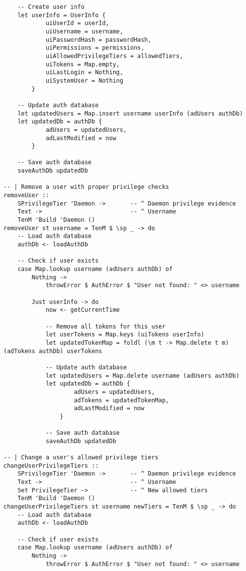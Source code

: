 \documentclass{article}
\begin{document}
\begin{tcolorbox}[title=Ten/Daemon/Auth.hs Changes]
\begin{verbatim}
    -- Create user info
    let userInfo = UserInfo {
            uiUserId = userId,
            uiUsername = username,
            uiPasswordHash = passwordHash,
            uiPermissions = permissions,
            uiAllowedPrivilegeTiers = allowedTiers,
            uiTokens = Map.empty,
            uiLastLogin = Nothing,
            uiSystemUser = Nothing
        }

    -- Update auth database
    let updatedUsers = Map.insert username userInfo (adUsers authDb)
    let updatedDb = authDb {
            adUsers = updatedUsers,
            adLastModified = now
        }

    -- Save auth database
    saveAuthDb updatedDb

-- | Remove a user with proper privilege checks
removeUser ::
    SPrivilegeTier 'Daemon ->       -- ^ Daemon privilege evidence
    Text ->                         -- ^ Username
    TenM 'Build 'Daemon ()
removeUser st username = TenM $ \sp _ -> do
    -- Load auth database
    authDb <- loadAuthDb

    -- Check if user exists
    case Map.lookup username (adUsers authDb) of
        Nothing ->
            throwError $ AuthError $ "User not found: " <> username

        Just userInfo -> do
            now <- getCurrentTime

            -- Remove all tokens for this user
            let userTokens = Map.keys (uiTokens userInfo)
            let updatedTokenMap = foldl (\m t -> Map.delete t m) (adTokens authDb) userTokens

            -- Update auth database
            let updatedUsers = Map.delete username (adUsers authDb)
            let updatedDb = authDb {
                    adUsers = updatedUsers,
                    adTokens = updatedTokenMap,
                    adLastModified = now
                }

            -- Save auth database
            saveAuthDb updatedDb

-- | Change a user's allowed privilege tiers
changeUserPrivilegeTiers ::
    SPrivilegeTier 'Daemon ->       -- ^ Daemon privilege evidence
    Text ->                         -- ^ Username
    Set PrivilegeTier ->            -- ^ New allowed tiers
    TenM 'Build 'Daemon ()
changeUserPrivilegeTiers st username newTiers = TenM $ \sp _ -> do
    -- Load auth database
    authDb <- loadAuthDb

    -- Check if user exists
    case Map.lookup username (adUsers authDb) of
        Nothing ->
            throwError $ AuthError $ "User not found: " <> username


\end{verbatim}
\end{tcolorbox}
\end{document}
